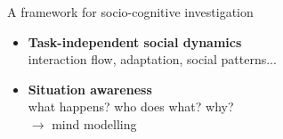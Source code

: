 \documentclass[xcolor=table]{beamer}
\begin{document}
\begin{frame}{A framework for socio-cognitive investigation}

    \begin{center}

    \Large


    \begin{itemize}
        \item {\bf Task-independent social dynamics}\\{\large interaction flow, adaptation,
            social patterns...}
        \item {\bf Situation awareness}\\{\large what happens? who does what?
            why?\\ $\rightarrow$ mind modelling}
    \end{itemize}

    \end{center}

\end{frame}
\end{document}
